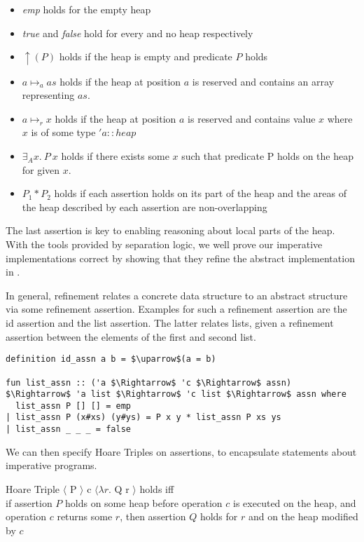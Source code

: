 \begin{itemize}
    \item \textit{emp} holds for the empty heap
    \item \textit{true} and \textit{false} hold for every and no heap respectively
    \item $\uparrow(P)$ holds if the heap is empty and predicate $P$ holds
    \item $a \mapsto_a as$ holds if the heap at position $a$ is reserved and contains
    an array representing $as$.
    \item $a \mapsto_r x$ holds if the heap at position $a$ is reserved and contains
    value $x$ where $x$ is of some type $'a::heap$
    \item $\exists_A x.\ P\ x$ holds if there exists some $x$ such that predicate P
    holds on the heap for given $x$.
    \item $P_1 * P_2$ holds if each assertion holds on its part of the heap
    and the areas of the heap described by each assertion are non-overlapping
\end{itemize}

The last assertion is key to enabling reasoning about local
parts of the heap.
With the tools provided by separation logic,
we well prove our imperative implementations correct
by showing that they refine the abstract implementation in .

In general, refinement relates a concrete data structure
to an abstract structure via some refinement assertion.
Examples for such a refinement assertion are the id assertion and the
list assertion.
The latter relates lists, given a refinement
assertion between the elements of the first and second list.

\begin{lstlisting}[mathescape=true, language=Isabelle]
definition id_assn a b = $\uparrow$(a = b)

fun list_assn :: ('a $\Rightarrow$ 'c $\Rightarrow$ assn) $\Rightarrow$ 'a list $\Rightarrow$ 'c list $\Rightarrow$ assn where
  list_assn P [] [] = emp
| list_assn P (x#xs) (y#ys) = P x y * list_assn P xs ys
| list_assn _ _ _ = false
\end{lstlisting}

We can then specify Hoare Triples on assertions,
to encapsulate statements about imperative programs.

\begin{definition}{Hoare Triple}
    $\langle$ P $\rangle$ c $\langle \lambda r. $ Q r $\rangle$ holds iff \\
    if assertion $P$ holds on some heap before operation $c$
    is executed on the heap,
    and operation $c$ returns some $r$, then assertion $Q$ holds
    for $r$ and on the heap modified by $c$
\end{definition}


